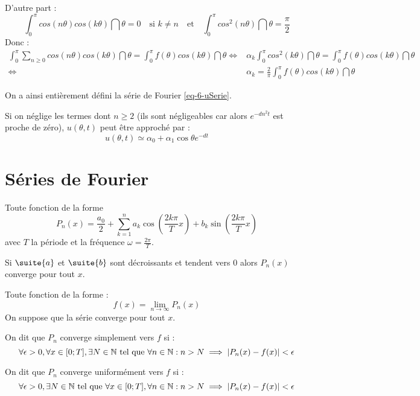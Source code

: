 		D'autre part :
		$$
			\int_0^\pi cos(n\theta) cos(k\theta) \dint{\theta} = 0 \quad\text{si } k\neq n
				\quad\text{et}\quad
			\int_0^\pi cos^2(n\theta) \dint{\theta} = \frac{\pi}{2}
		$$
		Donc :
		\begin{align*}
			\int_0^\pi \sum_{n\geq 0} cos(n\theta) cos(k\theta) \dint{\theta} = \int_0^\pi f(\theta) cos(k\theta) \dint{\theta}
				\iff &\alpha_k \int_0^\pi cos^2(k\theta) \dint{\theta} = \int_0^\pi f(\theta) cos(k\theta) \dint{\theta}	\\
				\iff &\alpha_k = \frac{2}{\pi} \int_0^\pi f(\theta) cos(k\theta) \dint{\theta}
		\end{align*}

		On a ainsi entièrement défini la série de Fourier \eqref{eq-6-uSerie}.

		Si on néglige les termes dont $n\geq 2$ (ils sont négligeables car alors $e^{-dn^2t}$ est proche de zéro), $u(\theta,t)$ peut être approché par :
		$$
			u(\theta,t) \simeq \alpha_0 + \alpha_1 \cos\theta e^{-dt}
		$$

\section{Séries de Fourier}
	
	\begin{definition}
		Toute fonction de la forme
		\begin{equation}
			\label{eq-6-polyTrigo}
			P_n(x) = \frac{a_0}{2} + \sum_{k=1}^n a_k \cos \left( \frac{2k\pi}{T}x \right) + b_k \sin \left( \frac{2k\pi}{T}x \right)
		\end{equation}
		avec $T$ la période et la fréquence $\omega = \frac{2\pi}{T}$.
	\end{definition}		
	\begin{prop}
		Si $\suite{a}$ et $\suite{b}$ sont décroissants et tendent vers $0$ alors $P_n(x)$ converge pour tout $x$.
	\end{prop}

	\begin{definition}
		Toute fonction de la forme :    
		\begin{equation}
			\label{eq-6-serieTrigo}
			f(x) = \lim_{n\to\infty} P_n(x)
		\end{equation}
		On suppose que la série converge pour tout $x$.
	\end{definition}		

	\medskip

	\begin{definition}
		On dit que $P_n$ converge simplement vers $f$ si :
		$$
			\forall\epsilon >0, \forall x \in [0;T], \exists N \in\mathbb{N} \text{ tel que } \forall n \in \mathbb{N} : n>N \implies \lvert P_n(x) - f(x) \rvert < \epsilon
		$$
	\end{definition}
	\begin{definition}
		On dit que $P_n$ converge uniformément vers $f$ si :
		$$
			\forall\epsilon >0, \exists N \in\mathbb{N} \text{ tel que } \forall x \in [0;T], \forall n \in \mathbb{N} : n>N \implies \lvert P_n(x) - f(x) \rvert < \epsilon
		$$
	\end{definition}


